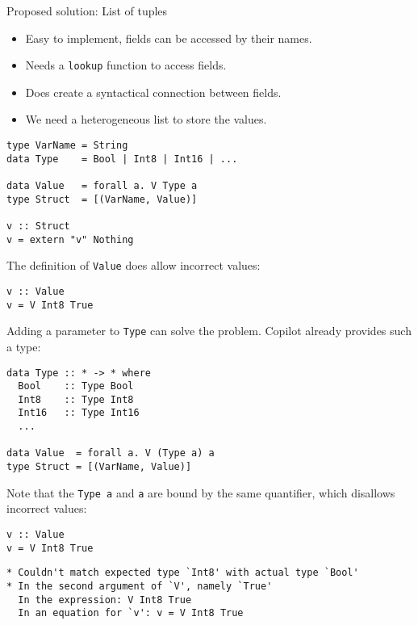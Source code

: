 \documentclass{beamer}
\begin{document}
\begin{frame}[fragile]{Proposed solution: List of tuples}
  \begin{itemize}
    \item Easy to implement, fields can be accessed by their names.
    \item Needs a \texttt{lookup} function to access fields.
    \item Does create a syntactical connection between fields.
    \item We need a heterogeneous list to store the values.
  \end{itemize}
\begin{lstlisting}
type VarName = String
data Type    = Bool | Int8 | Int16 | ...

data Value   = forall a. V Type a
type Struct  = [(VarName, Value)]

v :: Struct
v = extern "v" Nothing
\end{lstlisting}
\end{frame}

\begin{frame}[fragile]
  The definition of \texttt{Value} does allow incorrect values:
\begin{lstlisting}
v :: Value
v = V Int8 True
\end{lstlisting}
  Adding a parameter to \texttt{Type} can solve the problem. Copilot already
  provides such a type:
\begin{lstlisting}
data Type :: * -> * where
  Bool    :: Type Bool
  Int8    :: Type Int8
  Int16   :: Type Int16
  ...

data Value  = forall a. V (Type a) a
type Struct = [(VarName, Value)]
\end{lstlisting}
\end{frame}

\begin{frame}[fragile]
Note that the \texttt{Type a} and \texttt{a} are bound by the same
quantifier, which disallows incorrect values:
\begin{lstlisting}
v :: Value
v = V Int8 True
\end{lstlisting}

\begin{lstlisting}[basicstyle=\scriptsize,language={}]
* Couldn't match expected type `Int8' with actual type `Bool'
* In the second argument of `V', namely `True'
  In the expression: V Int8 True
  In an equation for `v': v = V Int8 True
\end{lstlisting}
\end{frame}
\end{document}

